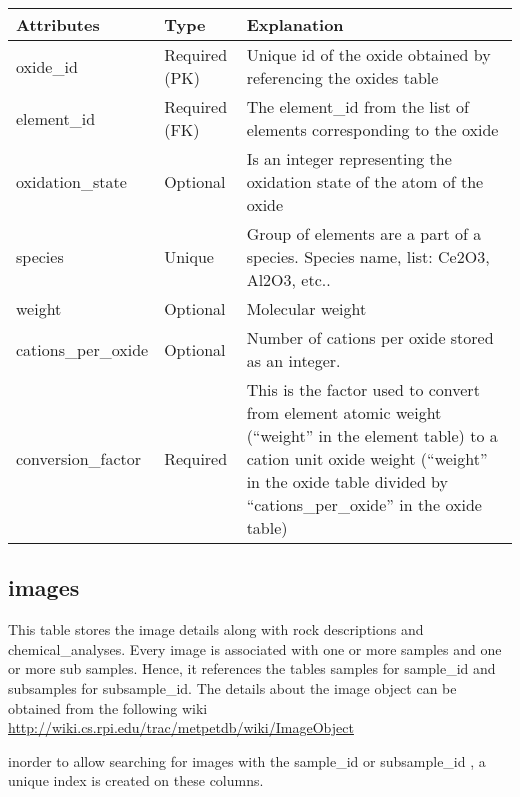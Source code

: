 \documentclass[letterpaper,10pt,english]{sphinxmanual}
\begin{document}
\begin{tabulary}{\linewidth}{|L|L|L|}
\hline
\textbf{
Attributes
} & \textbf{
Type
} & \textbf{
Explanation
}\\\hline

oxide\_id
 & 
Required (PK)
 & 
Unique id of the oxide obtained by referencing the oxides table
\\\hline

element\_id
 & 
Required (FK)
 & 
The element\_id from the list of elements corresponding to the oxide
\\\hline

oxidation\_state
 & 
Optional
 & 
Is an integer representing the oxidation state of the atom of the oxide
\\\hline

species
 & 
Unique
 & 
Group of elements are a part of a species. Species name, list:
Ce2O3, Al2O3, etc..
\\\hline

weight
 & 
Optional
 & 
Molecular weight
\\\hline

cations\_per\_oxide
 & 
Optional
 & 
Number of cations per oxide stored as an integer.
\\\hline

conversion\_factor
 & 
Required
 & 
This is the factor used to convert from element atomic weight
(``weight'' in the element table) to a cation unit oxide weight
(``weight'' in the oxide table divided by ``cations\_per\_oxide'' in
the oxide table)
\\\hline
\end{tabulary}



\subsection{images}
\label{Table_Description:images}
This table stores the image details along with rock descriptions and chemical\_analyses. Every image is associated with one or more samples and one or more sub samples. Hence, it references the tables samples for sample\_id and subsamples for subsample\_id.
The details about the image object can be obtained from the following wiki
\href{http://wiki.cs.rpi.edu/trac/metpetdb/wiki/ImageObject}{http://wiki.cs.rpi.edu/trac/metpetdb/wiki/ImageObject}

inorder to allow searching for images with the sample\_id or subsample\_id , a unique index is created on these columns.
\end{document}
